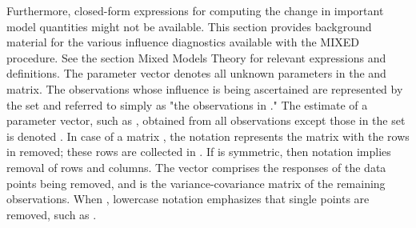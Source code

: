 \documentclass[Main.tex]{subfiles}
\begin{document}
Furthermore, closed-form expressions for computing the change in important model quantities might not be available.
This section provides background material for the various influence diagnostics available with the MIXED procedure. See the section Mixed Models Theory for relevant expressions and definitions. The parameter vector  denotes all unknown parameters in the  and  matrix.
The observations whose influence is being ascertained are represented by the set  and referred to simply as "the observations in ." The estimate of a parameter vector, such as , obtained from all observations except those in the set  is denoted . In case of a matrix , the notation  represents the matrix with the rows in  removed; these rows are collected in . If  is symmetric, then notation  implies removal of rows and columns. The vector  comprises the responses of the data points being removed, and  is the variance-covariance matrix of the remaining observations. When , lowercase notation emphasizes that single points are removed, such as .

\newpage


\end{document}
